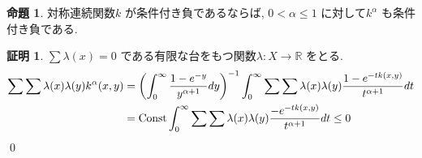 \documentclass[10pt, fleqn, label-section=none]{bxjsarticle}
\theoremstyle{definition}
\newtheorem{prop}[dfn]{命題}
\newtheorem*{pf*}{証明}
\newcommand{\paren}[1]{\mleft( #1\mright )}
\newcommand{\Const}{\textrm{Const}}
\renewcommand{\;}{\, ; \,}
\begin{document}
\begin{prop}対称連続関数$k$ が条件付き負であるならば, $0 < \alpha \leq 1$ に対して$k^\alpha $ も条件付き負である. 

\end{prop}
\begin{pf*}$\sum \lambda(x) = 0$ である有限な台をもつ関数$\lambda: X \rightarrow \mathbb R$ をとる.  
\begin{align*} \sum \sum \lambda(x) \lambda(y) k^\alpha (x, y) &= \paren{\int_0^\infty \frac{1 - e^{-y}}{y^{\alpha + 1}} dy}^{-1} \int_0^\infty \sum \sum \lambda(x) \lambda(y)  \frac{1 - e^{- tk(x, y) }}{t^{\alpha + 1}} dt  \\&= \Const \int_0^\infty \sum \sum \lambda(x) \lambda(y)  \frac{- e^{- tk(x, y) }}{t^{\alpha + 1}} dt  \leq 0  \end{align*}
\qed
\end{pf*}
\end{document}
